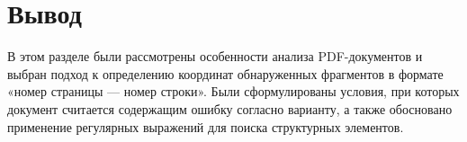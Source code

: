 \section{Вывод}

В этом разделе были рассмотрены особенности анализа PDF-документов и выбран подход к определению координат
обнаруженных фрагментов в формате «номер страницы --- номер строки».
Были сформулированы условия, при которых документ считается содержащим ошибку согласно варианту,
а также обосновано применение регулярных выражений для поиска структурных элементов.
